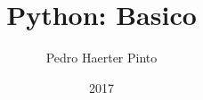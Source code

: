 \documentclass{article}
\title{Python: Basico}
\author{Pedro Haerter Pinto}
\date{2017}
\begin{document}
\newcommand{\code}[1]{{\bfseries \itshape \begin{center}#1 \end{center}}}
\newcommand{\si}{\noindent}
\newcommand{\bd}[1]{{\bfseries #1}}
\newcommand{\itc}[1]{{\itshape #1}}

\maketitle
\tableofcontents




\end{document}
